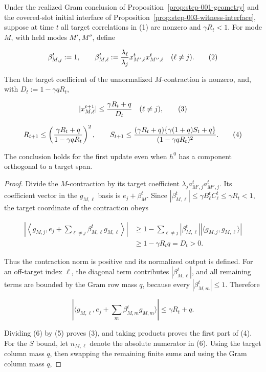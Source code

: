 \begin{lemma}\label{lem:step-004-recurrence}
Under the realized Gram conclusion of Proposition~\ref{prop:step-001-geometry}
and the covered-slot initial interface of Proposition~\ref{prop:step-003-witness-interface},
suppose at
time \(t\) all target correlations in (1) are nonzero and
\(\gamma R_t<1\). For mode \(M\), with held modes \(M',M''\), define

\[
\beta_{M,j}^t:=1,\qquad
\beta_{M,\ell}^t:={\lambda_\ell\over\lambda_j}
x_{M',\ell}^t x_{M'',\ell}^t\quad(\ell\ne j).
\tag{2}
\]

Then the target coefficient of the unnormalized \(M\)-contraction is nonzero,
and, with \(D_t:=1-\gamma qR_t\),

\[
|x_{M,\ell}^{t+1}|\le {\gamma R_t+q\over D_t}\quad(\ell\ne j),
\tag{3}
\]

\[
R_{t+1}\le\left({\gamma R_t+q\over1-\gamma qR_t}\right)^2,\qquad
S_{t+1}\le
{(\gamma R_t+q)\{\gamma(1+q)S_t+q\}\over(1-\gamma qR_t)^2}.
\tag{4}
\]

The conclusion holds for the first update even when \(h^0\) has a component
orthogonal to a target span.

\begin{proof}
Divide the \(M\)-contraction by its target
coefficient \(\lambda_j a_{M',j}^ta_{M'',j}^t\). Its coefficient vector in
the \(g_{M,\ell}\) basis is \(e_j+\beta_M^t\). Since
\(|\beta_{M,\ell}^t|\le\gamma B_\ell^tC_\ell^t\le\gamma R_t<1\), the target
coordinate of the contraction obeys

\[
\begin{aligned}
\left|\left\langle g_{M,j},e_j+
\sum_{\ell\ne j}\beta_{M,\ell}^tg_{M,\ell}\right\rangle\right|
&\ge1-\sum_{\ell\ne j}|\beta_{M,\ell}^t|
|\langle g_{M,j},g_{M,\ell}\rangle|\\
&\ge1-\gamma R_tq=D_t>0.
\end{aligned}
\tag{5}
\]

Thus the contraction norm is positive and its normalized output is defined.
For an off-target index \(\ell\), the diagonal term contributes
\(|\beta_{M,\ell}^t|\), and all remaining terms are bounded by the Gram row
mass \(q\), because every \(|\beta_{M,m}^t|\le1\). Therefore

\[
|\langle g_{M,\ell},e_j+\sum_m\beta_{M,m}^tg_{M,m}\rangle|
\le\gamma R_t+q.
\tag{6}
\]

Dividing (6) by (5) proves (3), and taking products proves the first part of
(4). For the \(S\) bound, let \(n_{M,\ell}\) denote the absolute numerator
in (6). Using the target column mass \(q\), then swapping the remaining finite
sums and using the Gram column mass \(q\),


\end{proof}
\end{lemma}
